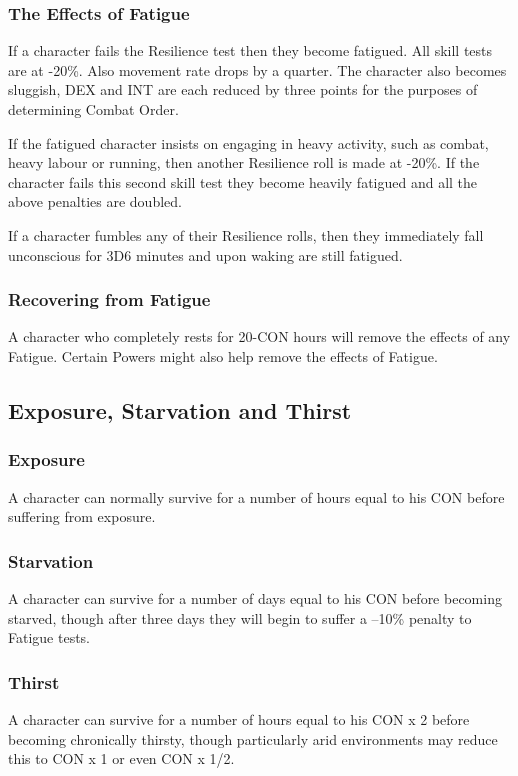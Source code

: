 \subsubsection{The Effects of Fatigue}
If a character fails the Resilience test then they become fatigued. All skill tests are at -20\%. Also movement rate drops by a quarter. The character also becomes sluggish, DEX and INT are each reduced by three points for the purposes of determining Combat Order.

If the fatigued character insists on engaging in heavy activity, such as combat, heavy labour or running, then another Resilience roll is made at -20\%. If the character fails this second skill test they become heavily fatigued and all the above penalties are doubled.

If a character fumbles any of their Resilience rolls, then they immediately fall unconscious for 3D6 minutes and upon waking are still fatigued.

\subsubsection{Recovering from Fatigue}
A character who completely rests for 20-CON hours will remove the effects of any Fatigue. Certain Powers might also help remove the effects of Fatigue.


\subsection{Exposure, Starvation and Thirst}

\subsubsection{Exposure}
A character can normally survive for a number of hours equal to his CON before suffering from exposure. 

\subsubsection{Starvation}
A character can survive for a number of days equal to his CON before becoming starved, though after three days they will begin to suffer a –10\% penalty to Fatigue tests. 

\subsubsection{Thirst}
A character can survive for a number of hours equal to his CON x 2 before becoming chronically thirsty, though particularly arid environments may reduce this to CON x 1 or even CON x 1/2. 

